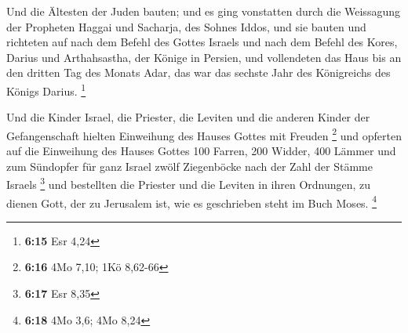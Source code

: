  Und die Ältesten der Juden bauten; und es ging
vonstatten durch die Weissagung der Propheten Haggai und Sacharja, des
Sohnes Iddos, und sie bauten und richteten auf nach dem Befehl des
Gottes Israels und nach dem Befehl des Kores, Darius und Arthahsastha,
der Könige in Persien,  und vollendeten das Haus bis an
den dritten Tag des Monats Adar, das war das sechste Jahr des
Königreichs des Königs Darius. \footnote{\textbf{6:15} Esr 4,24}

 Und die Kinder Israel, die Priester, die Leviten und die
anderen Kinder der Gefangenschaft hielten Einweihung des Hauses Gottes
mit Freuden \footnote{\textbf{6:16} 4Mo 7,10; 1Kö 8,62-66}
 und opferten auf die Einweihung des Hauses Gottes 100
Farren, 200 Widder, 400 Lämmer und zum Sündopfer für ganz Israel zwölf
Ziegenböcke nach der Zahl der Stämme Israels \footnote{\textbf{6:17} Esr
  8,35}  und bestellten die Priester und die Leviten in
ihren Ordnungen, zu dienen Gott, der zu Jerusalem ist, wie es
geschrieben steht im Buch Moses. \footnote{\textbf{6:18} 4Mo 3,6; 4Mo
  8,24}

